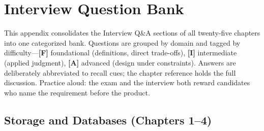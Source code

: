 \chapter{Interview Question Bank}
%
This appendix consolidates the Interview Q\&A sections of all twenty-five chapters into one
categorized bank. Questions are grouped by domain and tagged by difficulty---\textbf{[F]}
foundational (definitions, direct trade-offs), \textbf{[I]} intermediate (applied judgment),
\textbf{[A]} advanced (design under constraints). Answers are deliberately abbreviated to recall
cues; the chapter reference holds the full discussion. Practice aloud: the exam and the interview
both reward candidates who name the requirement before the product.

\section{Storage and Databases (Chapters 1--4)}
